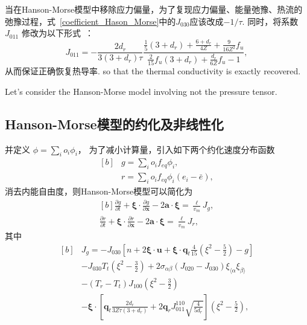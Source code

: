 当在Hanson-Morse模型中移除应力偏量，为了复现应力偏量、能量弛豫、热流的弛豫过程，式~\eqref{coefficient_Hason_Morse}中的$J_{030}$应该改成$-1/\tau$. 同时，将系数 $J_{011}$ 修改为以下形式~\cite{Boley1972CanJPhys,Pan2004}：
\begin{equation}
J_{011}=-\frac{2d_r}{3(3+d_r)\tau}
\frac{\frac{1}{5}(3+d_r)+\frac{6+d_r}{4Z}+\frac{9}{16Z^2}f_u}
{\frac{2}{15}f_u\left(3+d_r\right)+\frac{d_r}{6Z}f_u-1},
\end{equation}
从而保证正确恢复热导率.
so that the thermal conductivity is exactly recovered.

Let's consider the Hanson-Morse model involving not the pressure tensor. 
\subsection{Hanson-Morse模型的约化及非线性化}\label{reduced_HM}
并定义 $\phi=\sum_io_i\phi_i$，
为了减小计算量，引入如下两个约化速度分布函数
\begin{equation}
\begin{aligned}[b]
&g=\sum_i{o_i}f_{eq}{\phi_i}, \\ 
&r=\sum_i{o_i}f_{eq}{\phi_i}(e_i-\bar{e}),
\end{aligned}
\end{equation}
消去内能自由度，则Hanson-Morse模型可以简化为
\begin{equation}
\begin{aligned}[b]
\frac{\partial g}{\partial{}t}
+{\bm{\xi}}\cdot\frac{\partial
	g}{\partial \bm{x}}
-2{\bm{a}}\cdot\bm{\xi}=\frac{\ell}{v_m}{J}_g,\\
\frac{\partial r}{\partial{}t}
+{\bm{\xi}}\cdot\frac{\partial
	r}{\partial \bm{x}}
-2{\bm{a}}\cdot\bm{\xi}=\frac{\ell}{v_m}{J}_r,
\end{aligned}
\end{equation}
其中
\begin{equation}\label{HansonMorse_JG}
\begin{aligned}[b]
&{J}_g=-J_{030}\left[ {n}+2\bm{\xi}\cdot\bm{u}+\bm{\xi}\cdot\bm{q}_{t} \frac{4}{15}\left(\xi^2-\frac{5}{2}\right)-g\right]\\
&-J_{030}T_{t}\left(\xi^2-\frac{3}{2}\right)+{2\sigma_{\alpha\beta}}(J_{020}-J_{030})
\xi_{\langle \alpha}\xi_{\beta\rangle} \\
&-(T_{r}-T_{t})J_{100}\left(\xi^2-\frac{3}{2}\right)\\
&-\bm{\xi}\cdot\left[\bm{q}_{t} \frac{2d_r}{3Z\tau(3+d_r)}
+2\bm{q}_{r} {J}_{011}^{110}\sqrt{\frac{4}{5d_{r}}} \right]\left(\xi^2-\frac{5}{2}\right),
\end{aligned}
\end{equation}
